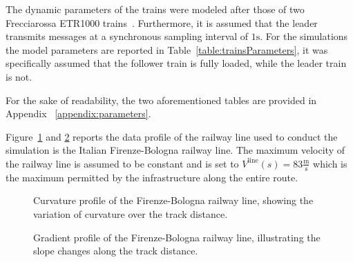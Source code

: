 \documentclass[letterpaper, 10 pt, conference]{ieeeconf}
\theoremstyle{definition}
\theoremstyle{nopoint}
\newcommand{\tildeAdd}{~}
\begin{document}
  The dynamic parameters of the trains were modeled after those of two Frecciarossa ETR1000 trains\tildeAdd\cite{frecciarossa}. Furthermore, it is assumed that the leader transmits messages at a synchronous sampling interval of $1\unit{\second}$. For the simulations the model parameters are reported in Table\tildeAdd\ref{table:trainsParameters}, it was specifically assumed that the follower train is fully loaded, while the leader train is not.
  
   For the sake of readability, the two aforementioned tables are provided in Appendix \tildeAdd\ref{appendix:parameters}.  
  
   Figure\tildeAdd\ref{fig:trackcurvature} and \ref{fig:trackgrad} reports the data profile of the railway line used to conduct the simulation is the Italian Firenze-Bologna railway line. The maximum velocity of the railway line is assumed to be constant and is set to $V^{\mathrm{line}}(s) = 83\unit{\frac{\unit{\meter}}{\unit{\second}}}$ which is the maximum permitted by the infrastructure along the entire route.
  
  	\begin{figure}[ht]
  			\caption{Curvature profile of the Firenze-Bologna railway line, showing the variation of curvature over the track distance.}
  			 \label{fig:trackcurvature}	
  		\end{figure}
  		
  		  	\begin{figure}[ht]
  			\caption{Gradient profile of the Firenze-Bologna railway line, illustrating the slope changes along the track distance.}
  			\label{fig:trackgrad}	
  		\end{figure}
  		
\end{document}
